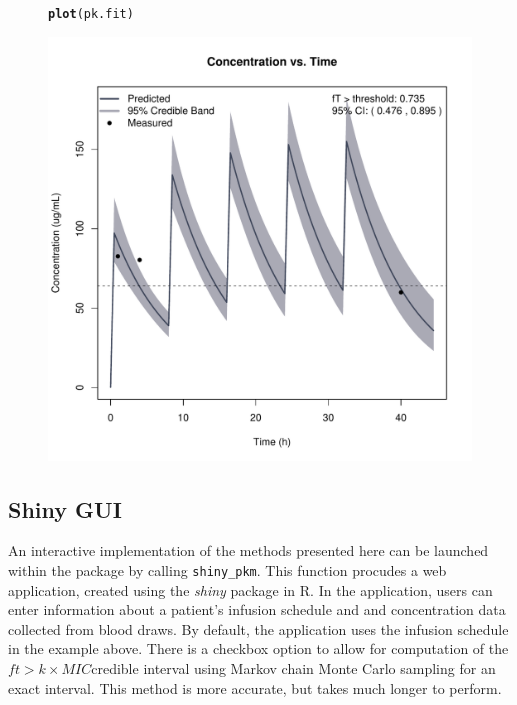 \documentclass{article}\usepackage[]{graphicx}\usepackage[]{color}
\makeatletter
\def\maxwidth{ %
  \ifdim\Gin@nat@width>\linewidth
    \linewidth
  \else
    \Gin@nat@width
  \fi
}
\newcommand{\hlstd}[1]{\textcolor[rgb]{0.345,0.345,0.345}{#1}}%
\newcommand{\hlkwd}[1]{\textcolor[rgb]{0.737,0.353,0.396}{\textbf{#1}}}%
\newenvironment{kframe}{%
 \def\at@end@of@kframe{}%
 \ifinner\ifhmode%
  \def\at@end@of@kframe{\end{minipage}}%
  \begin{minipage}{\columnwidth}%
 \fi\fi%
 \def\FrameCommand##1{\hskip\@totalleftmargin \hskip-\fboxsep
 \colorbox{shadecolor}{##1}\hskip-\fboxsep
     \hskip-\linewidth \hskip-\@totalleftmargin \hskip\columnwidth}%
 \MakeFramed {\advance\hsize-\width
   \@totalleftmargin\z@ \linewidth\hsize
   \@setminipage}}%
 {\par\unskip\endMakeFramed%
 \at@end@of@kframe}
\newenvironment{knitrout}{}{} %
\newcommand{\mic}{$ft > k \times MIC$}
\makeatother
\begin{document}
\begin{figure}
\begin{knitrout}
\color{fgcolor}\begin{kframe}
\begin{alltt}
\hlkwd{plot}\hlstd{(pk.fit)}
\end{alltt}
\end{kframe}
\includegraphics[width=\maxwidth]{figure/unnamed-chunk-15-1} 

\end{knitrout}
\end{figure}



\newpage

\subsection{Shiny GUI}

An interactive implementation of the methods presented here can be launched within the package by calling \texttt{shiny_pkm}. This function procudes a web application, created using the {\it shiny} package in R. In the application, users can enter information about a patient's infusion schedule and and concentration data collected from blood draws. By default, the application uses the infusion schedule in the example above. There is a checkbox option to allow for computation of the \mic credible interval using Markov chain Monte Carlo sampling for an exact interval. This method is more accurate, but takes much longer to perform.
\end{document}
